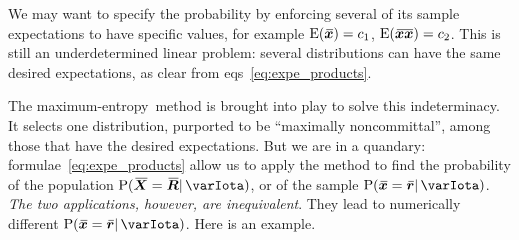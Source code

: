 \documentclass{article}
\theoremstyle{remark}
\theoremstyle{innote}
\renewcommand*{\|}{\mathpunct{|}}%
\newcommand*{\p}{\mathrm{P}}%
\newcommand*{\eqns}{eqs}%
\newcommand*{\E}{\mathrm{E}}
\DeclarePairedDelimiter\expp{(}{)}
\newcommand*{\expe}{\E\expp}%
\theoremstyle{simple}
\newcommand*{\widebar}[1]{{\mkern1.5mu\skew{2}\overline{\mkern-1.5mu#1\mkern-1.5mu}\mkern 1.5mu}}
\newcommand*{\av}{\widebar} %
\newcommand*{\sav}{\widebar} %
\newcommand*{\yxx}{x}%
\newcommand*{\yx}{\bm{\yxx}}%
\newcommand*{\yxs}{\sav{\yx}}%
\newcommand*{\yX}{\bm{X}}%
\newcommand*{\yXf}{\av{\yX}}%
\newcommand*{\yxxs}{\sav{\yx\yx}}%
\newcommand*{\yr}{\bm{r}}%
\newcommand*{\yrs}{\sav{\yr}}%
\newcommand*{\yR}{\bm{R}}%
\newcommand*{\yRf}{\av{\yR}}%
\newcommand*{\yH}{\varIota}
\newcommand*{\me}{maximum-entropy}
\begin{document}
We may want to specify the probability by enforcing several of its sample
expectations to have specific values, for example $\expe{\yxs}=c_1$,
$\expe{\yxxs}=c_2$. This is still an underdetermined linear problem:
 several distributions can have the same desired expectations, as
clear from \eqns~\eqref{eq:expe_products}.

The \me\ method is brought into play to solve this indeterminacy. It selects
one distribution, purported to be \enquote{maximally noncommittal}, among
those that have the desired expectations. But we are in a quandary:
formulae~\eqref{eq:expe_products} allow us to apply the method to find the
probability of the population $\p(\yXf=\yRf \| \yH)$, or of the sample
$\p(\yxs=\yrs \| \yH)$. \emph{The two applications, however, are
  inequivalent}. They lead to numerically different $\p(\yxs=\yrs \| \yH)$.
Here is an example.
\end{document}
